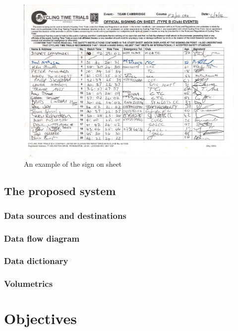 \begin{figure}[H]
    \includegraphics[width=\textwidth]{./SignOnTimeKeepersSheet.pdf}
    \caption{An example of the sign on sheet} \label{fig:Sign on Sheet}
\end{figure}
\subsection{The proposed system}

\subsubsection{Data sources and destinations}

\subsubsection{Data flow diagram}

\subsubsection{Data dictionary}

\subsubsection{Volumetrics}

\section{Objectives}

